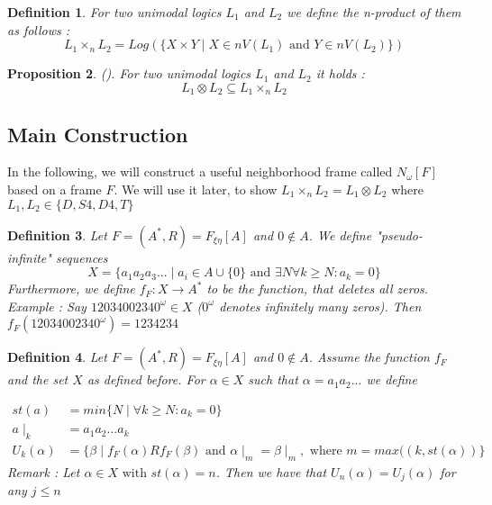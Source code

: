 \documentclass[12pt, a4paper]{scrartcl}
\newtheorem{definition}{Definition}[subsection]
\newtheorem{proposition}[definition]{Proposition}
\begin{document}
\begin{definition}
    For two unimodal logics $L_1$ and $L_2$ we define the n-product of them as follows :
    $$ L_1 \times_n L_2 = Log(\{ X \times Y \mid X \in nV(L_1) \mbox{ and } Y \in nV(L_2) \})$$        
\end{definition}

\begin{proposition}(\cite{?}).
    For two unimodal logics $L_1$ and $L_2$ it holds : 
    $$L_1 \otimes L_2 \subseteq L_1 \times_n L_2$$
\end{proposition}



\subsection{Main Construction}
In the following, we will construct a useful neighborhood frame called $N_\omega[F]$ based on a frame $F$.
We will use it later, to show $L_1 \times_n L_2 = L_1 \otimes L_2$ where $L_1,L_2 \in \{D,S4,D4,T\}$

\begin{definition}
    Let $F = (A^*, R) = F_{\xi \eta}[A]$ and $0 \notin A$. We define "pseudo-infinite" sequences 
    $$X = \{a_1a_2a_3... \mid a_i \in A \cup \{0\} \mbox{ and } \exists N \forall k \geq N : a_k = 0\}$$
    Furthermore, we define $f_F : X \rightarrow A^*$ to be the function, that deletes all zeros. \newline \newline
    Example : Say $12034002340^\omega \in X$ ($0^\omega$ denotes infinitely many zeros). Then $f_F(12034002340^\omega) = 1234234$

\end{definition}

\begin{definition}
    Let $F = (A^*, R) = F_{\xi \eta}[A]$ and $0 \notin A$. Assume the function $f_F$ and the set $X$ as defined before.
    For $\alpha \in X$ such that $\alpha = a_1a_2...$ we define 
    
    \begin{align*}
            st(a) &= min\{N \mid \forall k \geq N : a_k = 0\} \\
            a \mid_{k} &= a_1a_2...a_k \\
            U_k(\alpha) &= \{ \beta \mid f_F(\alpha)Rf_F(\beta) \mbox{ and } \alpha \mid_m = \beta \mid_m,  \mbox{ where } m = max((k, st(\alpha))\} 
    \end{align*} 
    Remark : Let $\alpha \in X \mbox{ with } st(\alpha) = n$. Then we have that $U_n(\alpha) = U_j(\alpha)$ for any $j \leq n$

\end{definition}
\end{document}
